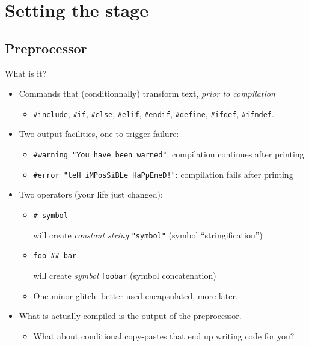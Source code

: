 \section{Setting the stage}

\subsection{Preprocessor}

\begin{frame}[fragile]{What is it?}

  \begin{itemize}
  \item Commands that (conditionnally) transform text, {\em prior to compilation}
    \begin{itemize}
    \item \lstinline{#include}, \lstinline{#if}, \lstinline{#else}, \lstinline{#elif}, \lstinline{#endif}, \lstinline{#define}, \lstinline{#ifdef}, \lstinline{#ifndef}.
    \end{itemize}
  \item Two output facilities, one to trigger failure:
    \begin{itemize}
    \item \lstinline{#warning "You have been warned"}: compilation continues after printing
    \item \lstinline{#error "teH iMPosSiBLe HaPpEneD!"}: compilation fails after printing
    \end{itemize}
  \item Two operators (your life just changed):
    \begin{itemize}
    \item \lstinline{# symbol}

      will create {\em constant string} \lstinline{"symbol"} (symbol ``stringification'')
    \item \lstinline{foo ## bar}

      will create {\em symbol} \lstinline{foobar} (symbol concatenation)
    \item One minor glitch: better used encapsulated, more later.
    \end{itemize}
  \item What is actually compiled is the output of the preprocessor.
    \begin{itemize}
    \item What about conditional copy-pastes that end up writing code for you?
    \end{itemize}
  \end{itemize}

\end{frame}

